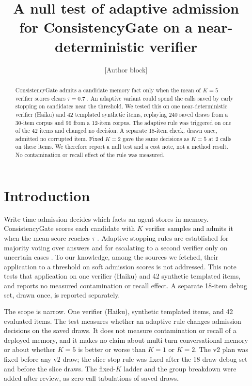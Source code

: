\documentclass[11pt]{article}
\title{A null test of adaptive admission for ConsistencyGate on a near-deterministic verifier}
\author{[Author block]}
\date{}
\begin{document}
\sloppy
\maketitle

\begin{abstract}
ConsistencyGate admits a candidate memory fact only when the mean of $K{=}5$ verifier scores clears $\tau{=}0.7$ \citep{consistencygate}. An adaptive variant could spend the calls saved by early stopping on candidates near the threshold. We tested this on one near-deterministic verifier (Haiku) and 42 templated synthetic items, replaying 240 saved draws from a 30-item corpus and 96 from a 12-item corpus. The adaptive rule was triggered on one of the 42 items and changed no decision. A separate 18-item check, drawn once, admitted no corrupted item. Fixed $K{=}2$ gave the same decisions as $K{=}5$ at 2 calls on these items. We therefore report a null test and a cost note, not a method result. No contamination or recall effect of the rule was measured.
\end{abstract}

\section{Introduction}
Write-time admission decides which facts an agent stores in memory. ConsistencyGate scores each candidate with $K$ verifier samples and admits it when the mean score reaches $\tau$ \citep{consistencygate}. Adaptive stopping rules are established for majority voting over answers \citep{adaptiveconsistency} and for escalating to a second verifier only on uncertain cases \citep{verifywhenuncertain}. To our knowledge, among the sources we fetched, their application to a threshold on soft admission scores is not addressed. This note tests that application on one verifier (Haiku) and 42 synthetic templated items, and reports no measured contamination or recall effect. A separate 18-item debug set, drawn once, is reported separately.

The scope is narrow. One verifier (Haiku), synthetic templated items, and 42 evaluated items. The test measures whether an adaptive rule changes admission decisions on the saved draws. It does not measure contamination or recall of a deployed memory, and it makes no claim about multi-turn conversational memory or about whether $K{=}5$ is better or worse than $K{=}1$ or $K{=}2$. The v2 plan was fixed before any v2 draw; the slice stop rule was fixed after the 18-draw debug set and before the slice draws. The fixed-$K$ ladder and the group breakdown were added after review, as zero-call tabulations of saved draws.
\end{document}
